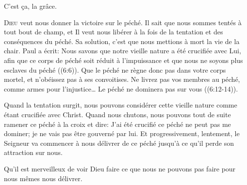C'est \c{c}a,  la grâce.

\dvrule







\lettrine{D}{ieu} veut nous donner la victoire sur le péché.
 Il sait que nous sommes tentés à tout bout de champ,
 et Il veut nous libérer à la fois de la tentation et des conséquences
 du péché. Sa solution, c'est que nous mettions à mort la vie de la chair.
 Paul a écrit: 
 \Og Nous savons que notre vieille nature a été crucifiée avec Lui,
 afin que ce corps de péché soit réduit à l'impuissance
 et que nous ne soyons plus esclaves du péché \Fg{} ((6:6)).
 \Og Que le péché ne règne donc pas dans votre corps mortel,
 et n'obéissez pas à ses convoitises. Ne livrez pas vos membres au péché,
 comme armes pour l'injustice\dots{}
 Le péché ne dominera pas sur vous \Fg{} ((6:12-14)).


Quand la tentation surgit, nous pouvons considérer cette vieille nature
 comme étant crucifiée avec Christ. Quand nous chutons, nous pouvons
 tout de suite ramener ce péché à la croix et dire: 
 \Og J'ai été crucifié \ocadr ce péché ne peut pas me dominer;
 je ne vais pas être gouverné par lui. \Fg{}
 Et progressivement, lentement, le Seigneur va commencer à nous délivrer
 de ce péché jusqu'à ce qu'il perde son attraction sur nous.

Qu'il est merveilleux de voir Dieu faire ce que nous ne pouvons pas faire
 pour nous mêmes \ocadr nous délivrer.

\dvrule


